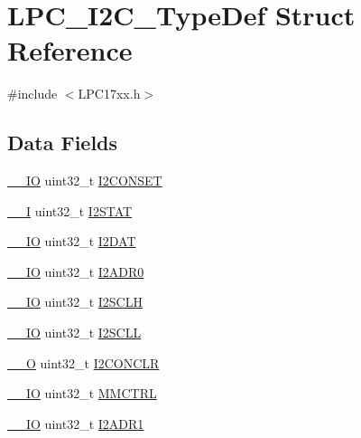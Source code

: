 \hypertarget{structLPC__I2C__TypeDef}{}\section{L\+P\+C\+\_\+\+I2\+C\+\_\+\+Type\+Def Struct Reference}
\label{structLPC__I2C__TypeDef}


{\ttfamily \#include $<$L\+P\+C17xx.\+h$>$}

\subsection*{Data Fields}
\begin{DoxyCompactItemize}
\item 
\hyperlink{LPC17xx_8h_aec43007d9998a0a0e01faede4133d6be}{\+\_\+\+\_\+\+IO} uint32\+\_\+t \hyperlink{structLPC__I2C__TypeDef_a24f797c8b2d60a001ade61b79aed6a16}{I2\+C\+O\+N\+S\+ET}
\item 
\hyperlink{LPC17xx_8h_af63697ed9952cc71e1225efe205f6cd3}{\+\_\+\+\_\+I} uint32\+\_\+t \hyperlink{structLPC__I2C__TypeDef_a31c1d47ac80feae537f5e52a1822ac35}{I2\+S\+T\+AT}
\item 
\hyperlink{LPC17xx_8h_aec43007d9998a0a0e01faede4133d6be}{\+\_\+\+\_\+\+IO} uint32\+\_\+t \hyperlink{structLPC__I2C__TypeDef_a61742ea91ae9c2922d72433666477fb0}{I2\+D\+AT}
\item 
\hyperlink{LPC17xx_8h_aec43007d9998a0a0e01faede4133d6be}{\+\_\+\+\_\+\+IO} uint32\+\_\+t \hyperlink{structLPC__I2C__TypeDef_a2b8bd06894697a92090ebff19efc9568}{I2\+A\+D\+R0}
\item 
\hyperlink{LPC17xx_8h_aec43007d9998a0a0e01faede4133d6be}{\+\_\+\+\_\+\+IO} uint32\+\_\+t \hyperlink{structLPC__I2C__TypeDef_af01afde227e49278f1c0e6a2041ce261}{I2\+S\+C\+LH}
\item 
\hyperlink{LPC17xx_8h_aec43007d9998a0a0e01faede4133d6be}{\+\_\+\+\_\+\+IO} uint32\+\_\+t \hyperlink{structLPC__I2C__TypeDef_acb1c72614b4277afac12c2152a47dc26}{I2\+S\+C\+LL}
\item 
\hyperlink{LPC17xx_8h_a7e25d9380f9ef903923964322e71f2f6}{\+\_\+\+\_\+O} uint32\+\_\+t \hyperlink{structLPC__I2C__TypeDef_a3251518905db7b64c27cb38ca9863fb2}{I2\+C\+O\+N\+C\+LR}
\item 
\hyperlink{LPC17xx_8h_aec43007d9998a0a0e01faede4133d6be}{\+\_\+\+\_\+\+IO} uint32\+\_\+t \hyperlink{structLPC__I2C__TypeDef_a132689ac34ccf6d86dc52216b4c4987c}{M\+M\+C\+T\+RL}
\item 
\hyperlink{LPC17xx_8h_aec43007d9998a0a0e01faede4133d6be}{\+\_\+\+\_\+\+IO} uint32\+\_\+t \hyperlink{structLPC__I2C__TypeDef_a4b5978241a790c38417a1ef872e663df}{I2\+A\+D\+R1}

\end{DoxyCompactItemize}
